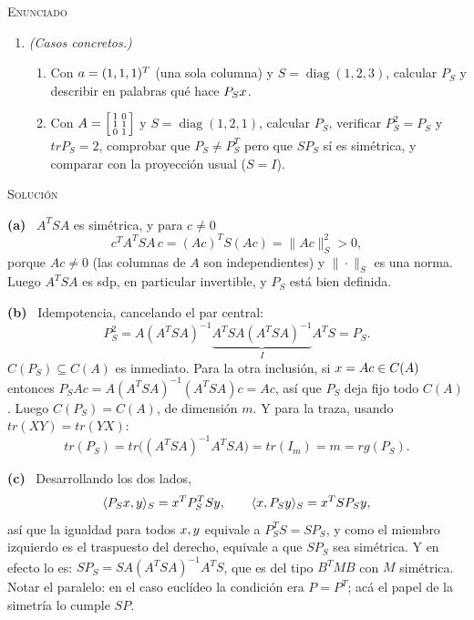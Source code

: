 \documentclass[11pt,a4paper]{article}
\newcommand{\bi}[1]{\boldsymbol{#1}}
\newcommand{\n}[1]{\boldsymbol{#1}}
\DeclareMathOperator{\gen}{span}
\DeclareMathOperator{\tr}{tr}
\DeclareMathOperator{\rg}{rg}
\DeclareMathOperator{\diag}{diag}
\def\n#1{#1}\def\bi#1{#1}\def\rg{rg}\def\tr{tr}\def\gen{span}%
\newcounter{entrega}[section]
\newenvironment{enunciado}{%
  \begin{enunciadobox}%
  \noindent\textsc{Enunciado}\par\smallskip\noindent\ignorespaces}%
  {\end{enunciadobox}}
\newcommand{\solucion}{\par\medskip\noindent\textsc{Solución}\par\nobreak\smallskip\noindent}
\newcommand{\itemsol}[1]{\par\medskip\noindent\textbf{(#1)}\ \ignorespaces}
\begin{document}
\begin{enunciado}
\begin{enumerate}[label=\textbf{(\alph*)},itemsep=3pt,topsep=4pt]
\item \emph{(Casos concretos.)}
\begin{enumerate}[label=\textup{(\roman*)},itemsep=2pt,topsep=3pt]
\item Con $\ba=(1,1,1)^T$ (una sola columna) y $S=\diag(1,2,3)$, calcular
$P_S$ y describir en palabras qué hace $P_S\bx$.
\item Con
$A=\begin{bsmallmatrix}1&0\\ 1&1\\ 0&1\end{bsmallmatrix}$ y
$S=\diag(1,2,1)$, calcular $P_S$, verificar $P_S^2=P_S$ y $\tr P_S=2$,
comprobar que $P_S\neq P_S^T$ pero que $SP_S$ sí es simétrica, y comparar con
la proyección usual ($S=I$).
\end{enumerate}
\end{enumerate}

\medskip
{}
\end{enunciado}
\solucion
\itemsol{a} $A^TSA$ es simétrica, y para $\bi{c}\neq\n0$
\[
\bi{c}^TA^TSA\,\bi{c}=(A\bi{c})^TS(A\bi{c})=\|A\bi{c}\|_S^{2}>0 ,
\]
porque $A\bi{c}\neq\n0$ (las columnas de $A$ son independientes) y $\|\cdot\|_S$
es una norma. Luego $A^TSA$ es sdp, en particular invertible, y $P_S$ está bien
definida.

\itemsol{b} Idempotencia, cancelando el par central:
\[
P_S^{2}=A(A^TSA)^{-1}\underbrace{A^TSA(A^TSA)^{-1}}_{I}A^TS=P_S .
\]
$C(P_S)\subseteq C(A)$ es inmediato. Para la otra inclusión, si
$\bx=A\bi{c}\in C(A)$ entonces
$P_SA\bi{c}=A(A^TSA)^{-1}(A^TSA)\bi{c}=A\bi{c}$, así que $P_S$ deja fijo todo
$C(A)$. Luego $C(P_S)=C(A)$, de dimensión $m$. Y para la traza, usando
$\tr(XY)=\tr(YX)$:
\[
\tr(P_S)=\tr\big((A^TSA)^{-1}A^TSA\big)=\tr(I_m)=m=\rg(P_S).
\]

\itemsol{c} Desarrollando los dos lados,
\[
\langle P_S\bx,\by\rangle_S=\bx^TP_S^{T}S\by,\qquad
\langle \bx,P_S\by\rangle_S=\bx^TSP_S\by ,
\]
así que la igualdad para todos $\bx,\by$ equivale a $P_S^TS=SP_S$, y como el
miembro izquierdo es el traspuesto del derecho, equivale a que $SP_S$ sea
simétrica. Y en efecto lo es: $SP_S=SA(A^TSA)^{-1}A^TS$, que es del tipo
$B^TMB$ con $M$ simétrica. Notar el paralelo: en el caso euclídeo la condición
era $P=P^T$; acá el papel de la simetría lo cumple $SP$.
\end{document}
